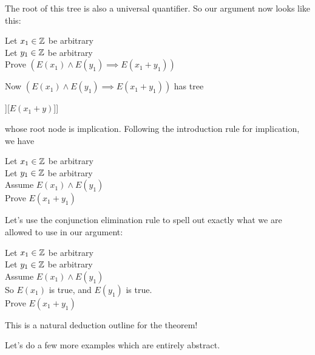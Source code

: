 The root of this tree is also a universal quantifier.  So our argument now looks like this:

\begin{fitch*}
	\textrm{Let $x_1 \in \mathbb{Z}$ be arbitrary}\\
	\textrm{Let $y_1 \in \mathbb{Z}$ be arbitrary}\\ 
	\textrm{Prove $\left( E(x_1) \wedge E(y_1) \implies E(x_1+y_1) \right)$}\\
\end{fitch*}

Now $\left( E(x_1) \wedge E(y_1) \implies E(x_1+y_1) \right)$ has tree

\begin{center}
	\begin{forest}
	[$\implies$[$\wedge$[$E(x_1)$][$E(y)$]][$E(x_1+y)$]]
	\end{forest}
\end{center}

whose root node is implication.  Following the introduction rule for implication, we have

\begin{fitch*}
	\textrm{Let $x_1 \in \mathbb{Z}$ be arbitrary}\\
	\textrm{Let $y_1 \in \mathbb{Z}$ be arbitrary}\\ 
	\textrm{Assume $E(x_1) \wedge E(y_1)$}\\
	\fa \textrm{ Prove  $E(x_1+y_1)$}\\
\end{fitch*}

Let's use the conjunction elimination rule to spell out exactly what we are allowed to use in our argument:

\begin{fitch*}
	\textrm{Let $x_1 \in \mathbb{Z}$ be arbitrary}\\
	\textrm{Let $y_1 \in \mathbb{Z}$ be arbitrary}\\ 
	\textrm{Assume $E(x_1) \wedge E(y_1)$}\\
	\fa \textrm{ So $E(x_1)$ is true, and $E(y_1)$ is true.}\\
	\fa \textrm{ Prove  $E(x_1+y_1)$}\\
\end{fitch*}

This is a natural deduction outline for the theorem!

Let's do a few more examples which are entirely abstract.

